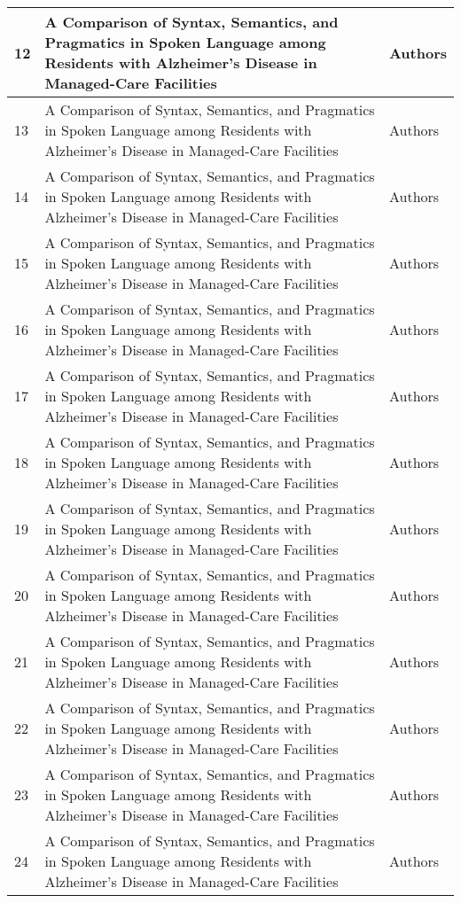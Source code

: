 \documentclass[12pt]{article}
\begin{document}
\begin{table}
\begin{tabular}{ p{1cm} | p{6cm} | p{6cm}}
	12 & A Comparison of Syntax, Semantics, and Pragmatics in Spoken Language among Residents with Alzheimer's Disease in Managed-Care Facilities & Authors \\ \hline
	13 & A Comparison of Syntax, Semantics, and Pragmatics in Spoken Language among Residents with Alzheimer's Disease in Managed-Care Facilities & Authors \\ \hline
	14 & A Comparison of Syntax, Semantics, and Pragmatics in Spoken Language among Residents with Alzheimer's Disease in Managed-Care Facilities & Authors \\ \hline
	15 & A Comparison of Syntax, Semantics, and Pragmatics in Spoken Language among Residents with Alzheimer's Disease in Managed-Care Facilities & Authors \\ \hline
	16 & A Comparison of Syntax, Semantics, and Pragmatics in Spoken Language among Residents with Alzheimer's Disease in Managed-Care Facilities & Authors \\ \hline
	17 & A Comparison of Syntax, Semantics, and Pragmatics in Spoken Language among Residents with Alzheimer's Disease in Managed-Care Facilities & Authors \\ \hline
	18 & A Comparison of Syntax, Semantics, and Pragmatics in Spoken Language among Residents with Alzheimer's Disease in Managed-Care Facilities & Authors \\ \hline
	19 & A Comparison of Syntax, Semantics, and Pragmatics in Spoken Language among Residents with Alzheimer's Disease in Managed-Care Facilities & Authors \\ \hline
	20 & A Comparison of Syntax, Semantics, and Pragmatics in Spoken Language among Residents with Alzheimer's Disease in Managed-Care Facilities & Authors \\ \hline
	21 & A Comparison of Syntax, Semantics, and Pragmatics in Spoken Language among Residents with Alzheimer's Disease in Managed-Care Facilities & Authors \\ \hline
	22 & A Comparison of Syntax, Semantics, and Pragmatics in Spoken Language among Residents with Alzheimer's Disease in Managed-Care Facilities & Authors \\ \hline
	23 & A Comparison of Syntax, Semantics, and Pragmatics in Spoken Language among Residents with Alzheimer's Disease in Managed-Care Facilities & Authors \\ \hline
	24 & A Comparison of Syntax, Semantics, and Pragmatics in Spoken Language among Residents with Alzheimer's Disease in Managed-Care Facilities & Authors \\ \hline

\end{tabular}
\end{table}
\end{document}
